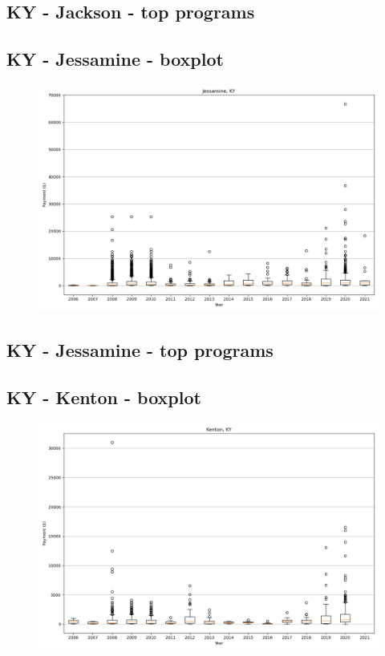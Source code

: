 \subsection*{KY - Jackson - top programs}

\newpage
\subsection*{KY - Jessamine - boxplot}
\begin{figure}[h]
\centering
\includegraphics[width=7in]{../output/boxplots/counties/Jessamine-KY_boxplot.png}
\end{figure}


\subsection*{KY - Jessamine - top programs}

\newpage
\subsection*{KY - Kenton - boxplot}
\begin{figure}[h]
\centering
\includegraphics[width=7in]{../output/boxplots/counties/Kenton-KY_boxplot.png}
\end{figure}



